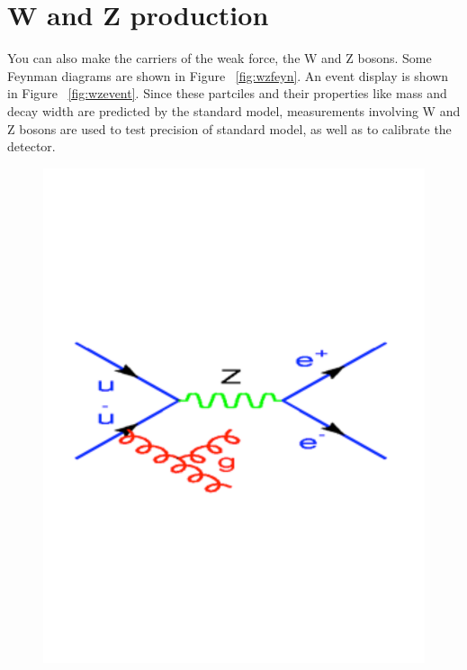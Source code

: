 \section{W and Z production}

You can also make the carriers of the weak force, the W and Z bosons.  Some Feynman diagrams are shown in Figure ~\ref{fig:wzfeyn}.
An event display is shown in Figure ~\ref{fig:wzevent}. Since these partciles and their properties like mass and decay width are predicted by the standard model, measurements involving W and Z  bosons are used to test precision of standard model, as well as to calibrate the detector. 


\begin{figure}[h]
\centering\includegraphics[scale=0.2]{./protonprotoncollisions/Pictures/wz1.pdf}

\end{figure}
